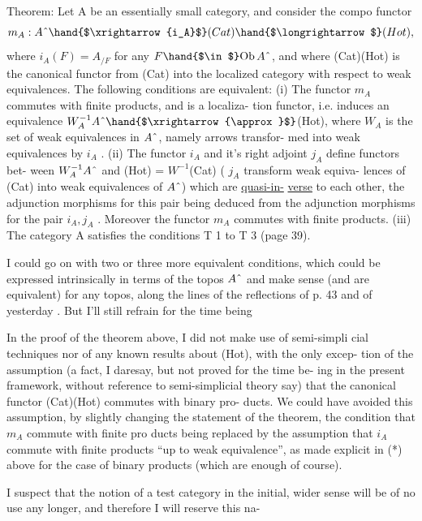
Theorem: Let A be an essentially small category, and consider the compo
 functor
\[ m_A : A\char`\^ \hand{$\xrightarrow{i_A}$} (Cat)\hand{$\longrightarrow$}(Hot) , \]
where $i_A(F) = A_{/F}$ for any $F \hand{$\in$} \mathrm{Ob}\, A\char`\^$, and where (Cat)\hand{$\longrightarrow$}(Hot) is the
canonical functor from (Cat) into the localized category with respect to
weak equivalences. The following conditions are equivalent:
(i) The functor $m_A$ commutes with finite products, and is a localiza-
tion functor, i.e. induces an equivalence $W_A^{-1}A\char`\^ \hand{$\xrightarrow{\approx}$}$(Hot), where
$W_A$ is the set of weak equivalences in $A\char`\^$, namely arrows transfor-
med into weak equivalences by $i_A$ . 
(ii) The functor $i_A$ and it's right adjoint $j_A$  define functors bet-
ween $W_A^{-1}A\char`\^$ and (Hot) = $W^{-1}$(Cat) ( $j_A$  transform weak equiva-
lences of (Cat) into weak equivalences of $A\char`\^$) which are \uline{quasi-in-}%
\uline{verse} to each other, the adjunction morphisms for this pair being
deduced from the adjunction morphisms for the pair $i_A, j_A$ . Moreover
the functor $m_A$ commutes with finite products.
(iii) The category A satisfies the  conditions T 1 to T 3
(page 39).

I could go on with two or three more equivalent conditions, which
could be expressed intrinsically in terms of the topos $A\char`\^$ and make sense
(and are equivalent) for any topos, along the lines of the reflections of
p. 43 and of yesterday . But I'll still refrain for the time being\hand{!}

In the proof of the theorem above, I did not make use of semi-simpli\unsure{-}%
cial techniques nor of any known results about (Hot), with the only excep-%
tion of the assumption (a fact, I daresay, but not proved for the time be-%
ing in the present framework, without reference to semi-simplicial theory
say) that the canonical functor (Cat)\hand{$\longrightarrow$}(Hot) commutes with binary pro-%
ducts. We could have avoided this assumption, by slightly changing the
statement of the theorem, the condition that $m_A$ commute with finite pro%
ducts  being replaced by the assumption that $i_A$ commute with finite products
``up to weak equivalence'', as made explicit in (*) above for the case of
binary products (which are enough of course).

I suspect that the notion of a test category in the initial, wider
sense will be of no use any longer, and therefore I will reserve this na-%
